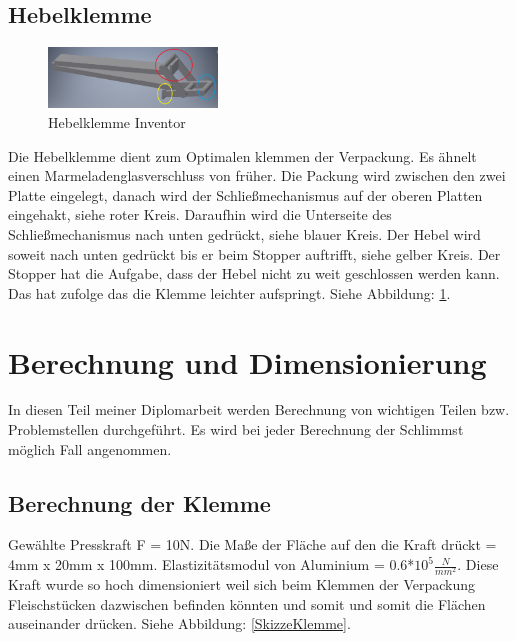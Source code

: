 \subsection{Hebelklemme}

\begin{figure}
\vspace{-20pt}
  \begin{center}
    \includegraphics[width=0.40\textwidth]{Bilder/Inventor/Hebel_Klemme}
  \end{center}
  \caption{Hebelklemme Inventor}
  \label{Hebel_Klemme_Inventor}
  \vspace{-10pt}
\end{figure}

Die Hebelklemme dient zum Optimalen klemmen der Verpackung.
Es ähnelt einen Marmeladenglasverschluss von früher. Die Packung wird zwischen den zwei Platte eingelegt, danach wird der Schließmechanismus auf der oberen Platten eingehakt, siehe roter Kreis. Daraufhin wird die Unterseite des Schließmechanismus nach unten gedrückt, siehe blauer Kreis.
Der Hebel wird soweit nach unten gedrückt bis er beim Stopper auftrifft, siehe gelber Kreis. Der Stopper hat die Aufgabe, dass der Hebel nicht zu weit geschlossen werden kann. Das hat zufolge das die Klemme leichter aufspringt. Siehe Abbildung: \ref{Hebel_Klemme_Inventor}.

\section{Berechnung und Dimensionierung}

In diesen Teil meiner Diplomarbeit werden Berechnung von wichtigen Teilen bzw. Problemstellen durchgeführt. Es wird bei jeder Berechnung der Schlimmst möglich Fall angenommen.

\subsection{Berechnung der Klemme}

Gewählte Presskraft F = 10N. Die Maße der Fläche auf den die Kraft drückt = 4mm x 20mm x 100mm. Elastizitätsmodul von Aluminium = 0.6*$10^{5}\frac{N}{mm^{2}}$.
Diese Kraft wurde so hoch dimensioniert weil sich beim Klemmen der Verpackung Fleischstücken dazwischen befinden könnten und somit und somit die Flächen auseinander drücken. Siehe Abbildung: \ref{SkizzeKlemme}.

